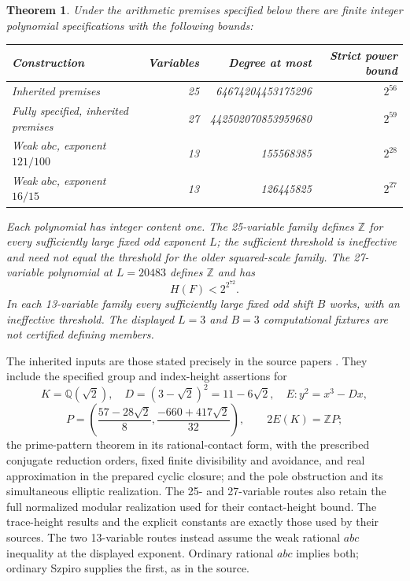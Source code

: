 \documentclass[11pt,a4paper]{article}
\newtheorem{theorem}{Theorem}[section]
\theoremstyle{remark}\newtheorem{remark}[theorem]{Remark}
\newcommand{\Q}{\mathbb Q}\newcommand{\Z}{\mathbb Z}\newcommand{\C}{\mathbb C}
\begin{document}
\begin{theorem}\label{thm:main}
Under the arithmetic premises specified below there are finite integer
polynomial specifications with the following bounds:
\begin{center}\begin{tabular}{lrrr}\toprule
Construction & Variables & Degree at most & Strict power bound\\\midrule
Inherited premises &25&64674204453175296&$2^{56}$\\
Fully specified, inherited premises&27&442502070853959680&$2^{59}$\\
Weak $abc$, exponent $121/100$&13&155568385&$2^{28}$\\
Weak $abc$, exponent $16/15$&13&126445825&$2^{27}$\\\bottomrule
\end{tabular}\end{center}
Each polynomial has integer content one. The 25-variable family defines
$\Z$ for every sufficiently large fixed odd exponent $L$; the sufficient
threshold is ineffective and need not equal the threshold for the older
squared-scale family. The 27-variable polynomial at $L=20483$ defines
$\Z$ and has
\[
 H(F)<2^{2^{72}}.
\]
In each 13-variable family every sufficiently large fixed odd shift
$B$ works, with an ineffective threshold. The displayed $L=3$ and $B=3$
computational fixtures are not certified defining members.
\end{theorem}

The inherited inputs are those stated precisely in the source papers
\cite{General,Explicit,Conditional}. They include the specified group
and index-height assertions for
\[
 K=\Q(\sqrt2),\quad D=(3-\sqrt2)^2=11-6\sqrt2,\quad
 E:y^2=x^3-Dx,
\]
\[
 P=\left(\frac{57-28\sqrt2}{8},\frac{-660+417\sqrt2}{32}\right),
 \qquad 2E(K)=\Z P;
\]
the prime-pattern theorem in its rational-contact form, with the
prescribed conjugate reduction orders, fixed finite divisibility and
avoidance, and real approximation in the prepared cyclic closure;
and the pole obstruction and its simultaneous elliptic realization.
The 25- and 27-variable routes also retain the full normalized modular
realization used for their contact-height bound. The trace-height
results and the explicit constants are exactly those used by their sources.
The two 13-variable routes instead assume the weak rational $abc$
inequality at the displayed exponent. Ordinary rational $abc$ implies
both; ordinary Szpiro supplies the first, as in the source.
\end{document}
